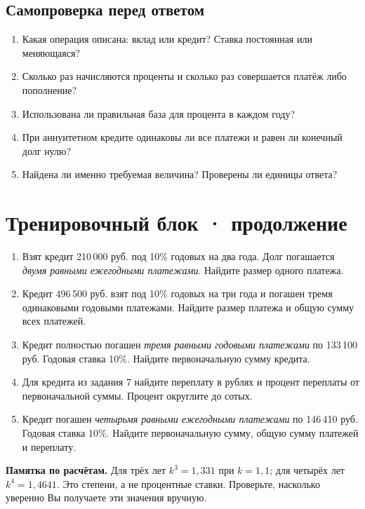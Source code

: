 \documentclass[a4paper,12pt]{article}
\newcommand{\smallrule}{\par\smallskip\noindent{\color{lightline}\rule{\linewidth}{.4pt}}\par\smallskip}
\begin{document}
\subsection*{Самопроверка перед ответом}
\begin{enumerate}
\item Какая операция описана: вклад или кредит? Ставка постоянная или меняющаяся?
\item Сколько раз начисляются проценты и сколько раз совершается платёж либо пополнение?
\item Использована ли правильная база для процента в каждом году?
\item При аннуитетном кредите одинаковы ли все платежи и равен ли конечный долг нулю?
\item Найдена ли именно требуемая величина? Проверены ли единицы ответа?
\end{enumerate}



\clearpage
\section*{Тренировочный блок · продолжение}
\begin{enumerate}[start=6]
\item Взят кредит 210\,000 руб. под 10\% годовых на два года. Долг погашается \emph{двумя равными ежегодными платежами}. Найдите размер одного платежа.
\item Кредит 496\,500 руб. взят под 10\% годовых на три года и погашен тремя одинаковыми годовыми платежами. Найдите размер платежа и общую сумму всех платежей.
\item Кредит полностью погашен \emph{тремя равными годовыми платежами} по 133\,100 руб. Годовая ставка 10\%. Найдите первоначальную сумму кредита.
\item Для кредита из задания 7 найдите переплату в рублях и процент переплаты от первоначальной суммы. Процент округлите до сотых.
\item Кредит погашен \emph{четырьмя равными ежегодными платежами} по 146\,410 руб. Годовая ставка 10\%. Найдите первоначальную сумму, общую сумму платежей и переплату.
\end{enumerate}
\vspace{8mm}
\smallrule
\textbf{Памятка по расчётам.} Для трёх лет \(k^3=1{,}331\) при \(k=1{,}1\); для четырёх лет \(k^4=1{,}4641\). Это степени, а не процентные ставки. Проверьте, насколько уверенно Вы получаете эти значения вручную.
\end{document}
